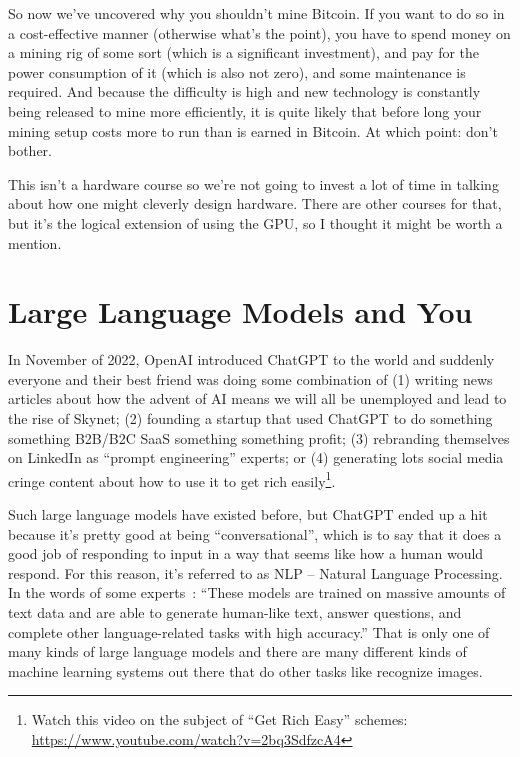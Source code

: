 So now we've uncovered why you shouldn't mine Bitcoin. If you want to do so in a cost-effective manner (otherwise what's the point), you have to spend money on a mining rig of some sort (which is a significant investment), and pay for the power consumption of it (which is also not zero), and some maintenance is required. And because the difficulty is high and new technology is constantly being released to mine more efficiently, it is quite likely that before long your mining setup costs more to run than is earned in Bitcoin. At which point: don't bother.

This isn't a hardware course so we're not going to invest a lot of time in talking about how one might cleverly design hardware. There are other courses for that, but it's the logical extension of using the GPU, so I thought it might be worth a mention.

\section*{Large Language Models and You}

In November of 2022, OpenAI introduced ChatGPT to the world and suddenly everyone and their best friend was doing some combination of (1) writing news articles about how the advent of AI means we will all be unemployed and lead to the rise of Skynet; (2) founding a startup that used ChatGPT to do something something B2B/B2C SaaS something something profit; (3) rebranding themselves on LinkedIn as ``prompt engineering'' experts; or (4) generating lots social media cringe content about how to use it to get rich easily\footnote{Watch this video on the subject of ``Get Rich Easy'' schemes: \url{https://www.youtube.com/watch?v=2bq3SdfzcA4}}.

Such large language models have existed before, but ChatGPT ended up a hit because it's pretty good at being ``conversational'', which is to say that it does a good job of responding to input in a way that seems like how a human would respond. For this reason, it's referred to as NLP -- Natural Language Processing. In the words of some experts~\cite{gptforgood}: ``These models are trained on massive amounts of text data and are able to generate human-like text, answer questions, and complete other language-related tasks with high accuracy.'' That is only one of many kinds of large language models and there are many different kinds of machine learning systems out there that do other tasks like recognize images.

